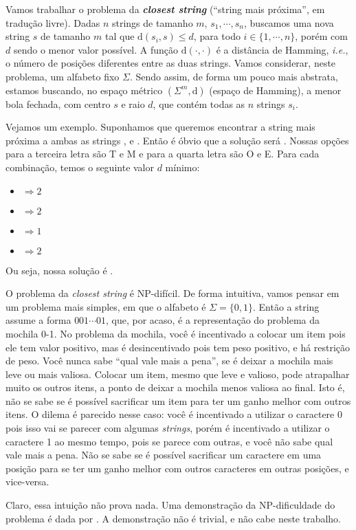 Vamos trabalhar o problema da \textbf{\textit{closest string}} (``string mais próxima'', em tradução livre). Dadas $n$ strings de tamanho $m$, $s_1, \cdots, s_n$, buscamos uma nova string $s$ de tamanho $m$ tal que $\text{d}(s_i, s) \le d$, para todo $i \in \{1, \cdots, n\}$, porém com $d$ sendo o menor valor possível. A função $\text{d}(\cdot, \cdot)$ é a distância de Hamming, \textit{i.e.}, o número de posições diferentes entre as duas strings. Vamos considerar, neste problema, um alfabeto fixo $\Sigma$.
Sendo assim, de forma um pouco mais abstrata, estamos buscando, no espaço métrico $\left(\Sigma^m, \text{d}\right)$ (espaço de Hamming), a menor bola fechada, com centro $s$ e raio $d$, que contém todas as $n$ strings $s_i$.

Vejamos um exemplo. Suponhamos que queremos encontrar a string mais próxima a ambas as strings ,  e . Então é óbvio que a solução será . Nossas opções para a terceira letra são T e M e para a quarta letra são O e E. Para cada combinação, temos o seguinte valor $d$ mínimo:
\begin{itemize}
    \item {} $\Rightarrow 2$
    \item {} $\Rightarrow 2$
    \item {} $\Rightarrow 1$
    \item {} $\Rightarrow 2$
\end{itemize}
Ou seja, nossa solução é .

O problema da \textit{closest string} é NP-difícil.
De forma intuitiva, vamos pensar em um problema mais simples, em que o alfabeto é $\Sigma = \{0, 1\}$. Então a string assume a forma $001 \cdots 01$, que, por acaso, é a representação do problema da mochila 0-1. No problema da mochila, você é incentivado a colocar um item pois ele tem valor positivo, mas é desincentivado pois tem peso positivo, e há restrição de peso. Você nunca sabe ``qual vale mais a pena'', se é deixar a mochila mais leve ou mais valiosa. Colocar um item, mesmo que leve e valioso, pode atrapalhar muito os outros itens, a ponto de deixar a mochila menos valiosa ao final. Isto é, não se sabe se é possível sacrificar um item para ter um ganho melhor com outros itens. O dilema é parecido nesse caso: você é incentivado a utilizar o caractere 0 pois isso vai se parecer com algumas \textit{strings}, porém é incentivado a utilizar o caractere 1 ao mesmo tempo, pois se parece com outras, e você não sabe qual vale mais a pena. Não se sabe se é possível sacrificar um caractere em uma posição para se ter um ganho melhor com outros caracteres em outras posições, e vice-versa.

Claro, essa intuição não prova nada. Uma demonstração da NP-dificuldade do problema é dada por \cite{frances1997covering}. A demonstração não é trivial, e não cabe neste trabalho.